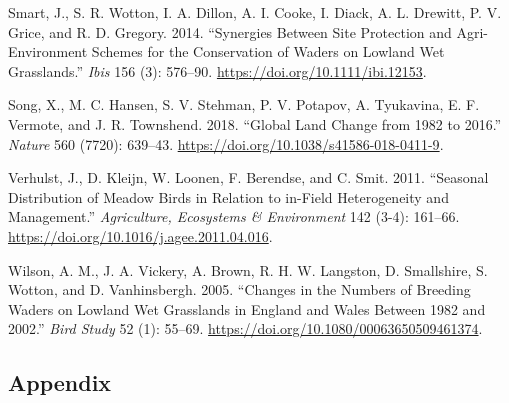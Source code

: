 \documentclass[
  12pt,
  letterpaper,
  DIV=11,
  numbers=noendperiod]{scrartcl}
\newlength{\cslhangindent}
\newenvironment{CSLReferences}[2] %
 {\begin{list}{}{%
  \setlength{\itemindent}{0pt}
  \setlength{\leftmargin}{0pt}
  \setlength{\parsep}{0pt}
  \ifodd #1
   \setlength{\leftmargin}{\cslhangindent}
   \setlength{\itemindent}{-1\cslhangindent}
  \fi
  \setlength{\itemsep}{#2\baselineskip}}}
 {\end{list}}
\begin{document}
\begin{CSLReferences}{1}{0}
Smart, J., S. R. Wotton, I. A. Dillon, A. I. Cooke, I. Diack, A. L.
Drewitt, P. V. Grice, and R. D. Gregory. 2014. {``Synergies Between Site
Protection and Agri{-}Environment Schemes for the Conservation of Waders
on Lowland Wet Grasslands.''} \emph{Ibis} 156 (3): 576--90.
\url{https://doi.org/10.1111/ibi.12153}.

Song, X., M. C. Hansen, S. V. Stehman, P. V. Potapov, A. Tyukavina, E.
F. Vermote, and J. R. Townshend. 2018. {``Global Land Change from 1982
to 2016.''} \emph{Nature} 560 (7720): 639--43.
\url{https://doi.org/10.1038/s41586-018-0411-9}.

Verhulst, J., D. Kleijn, W. Loonen, F. Berendse, and C. Smit. 2011.
{``Seasonal Distribution of Meadow Birds in Relation to in-Field
Heterogeneity and Management.''} \emph{Agriculture, Ecosystems \&
Environment} 142 (3-4): 161--66.
\url{https://doi.org/10.1016/j.agee.2011.04.016}.

Wilson, A. M., J. A. Vickery, A. Brown, R. H. W. Langston, D.
Smallshire, S. Wotton, and D. Vanhinsbergh. 2005. {``Changes in the
Numbers of Breeding Waders on Lowland Wet Grasslands in England and
Wales Between 1982 and 2002.''} \emph{Bird Study} 52 (1): 55--69.
\url{https://doi.org/10.1080/00063650509461374}.

\end{CSLReferences}

\newpage{}

\subsection{Appendix}\label{appendix}

\beginsupplement

\begingroup\fontsize{7}{9}\selectfont
\end{document}
